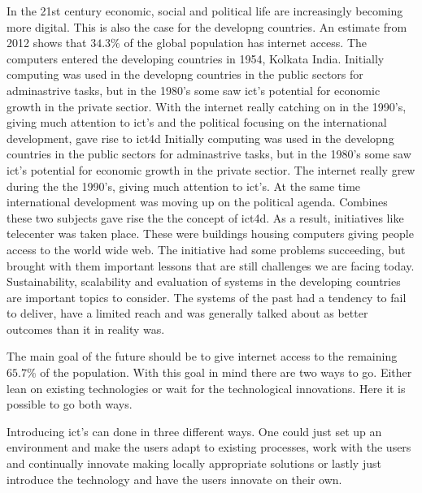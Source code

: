 In the 21st century economic, social and political life are increasingly becoming more digital. 
This is also the case for the developng countries. An estimate from 2012 shows that  $34.3\%$ of the global population has internet access.
The computers entered the developing countries in 1954, Kolkata India.
Initially computing was used in the developng countries in the public sectors for adminastrive tasks, but in the 1980's some saw \gls{ict}'s potential for economic growth in the private sectior.
With the internet really catching on in the 1990's, giving much attention to \gls{ict}'s and the political focusing on the international development, gave rise to \gls{ict4d}
Initially computing was used in the developng countries in the public sectors for adminastrive tasks, but in the 1980's some saw \gls{ict}'s potential for economic growth in the private sectior.
The internet really grew during the the 1990's, giving much attention to \gls{ict}'s.
At the same time international development was moving up on the political agenda.
Combines these two subjects gave rise the the concept of \gls{ict4d}.
As a result, initiatives like telecenter was taken place.
These were buildings housing computers giving people access to the world wide web.
The initiative had some problems succeeding, but brought with them important lessons that are still challenges we are facing today.
Sustainability, scalability and evaluation of systems in the developing countries are important topics to consider.
The systems of the past had a tendency to fail to deliver, have a limited reach and was generally talked about as better outcomes than it in reality was.

The main goal of the future should be to give internet access to the remaining $65.7\%$ of the population.
With this goal in mind there are two ways to go. Either lean on existing technologies or wait for the technological innovations.
Here it is possible to go both ways. 

Introducing \gls{ict}'s can done in three different ways.
One could just set up an environment and make the users adapt to existing processes, work with the users and continually innovate making locally appropriate solutions or lastly just introduce the technology and have the users innovate on their own. 

\cite{internet:stats}
\cite{icd4d:rh}


